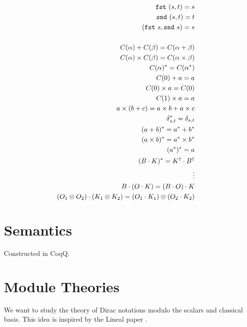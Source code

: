 
\begin{align*}
  \texttt{fst}\ (s, t) = s \\
  \texttt{snd}\ (s, t) = t \\
  (\texttt{fst}\ s, \texttt{snd}\ s) = s \\
  \\
  C(\alpha) + C(\beta) = C(\alpha + \beta) \\
  C(\alpha) \times C(\beta) = C(\alpha \times \beta) \\
  C(\alpha)^* = C(\alpha^*) \\
  C(0) + a = a \\
  C(0) \times a = C(0) \\
  C(1) \times a = a \\
  a \times (b + c) = a \times b + a \times c \\
  \delta_{s, t}^* = \delta_{s, t} \\
  (a + b)^* = a^* + b^* \\
  (a \times b)^* = a^* \times b^* \\
  (a^*)^* = a \\
  (B \cdot K)^* = K^\dagger \cdot B^\dagger \\
  \vdots \\
  B \cdot (O \cdot K) = (B \cdot O) \cdot K \\
  (O_1 \otimes O_2) \cdot (K_1 \otimes K_2) = (O_1 \cdot K_1) \otimes (O_2 \cdot K_2)
\end{align*}



\section{Semantics}
Constructed in CoqQ.

\section{Module Theories}

We want to study the theory of Dirac notations modulo the scalars and classical basis. This idea is inspired by the Lineal paper \cite{Arrighi2017}.

